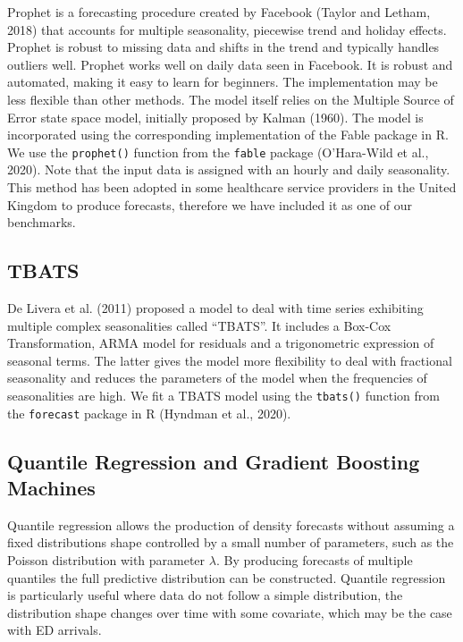 \documentclass[]{elsarticle} %
\begin{document}
Prophet is a forecasting procedure created by Facebook
(Taylor and Letham, 2018) that accounts for multiple seasonality,
piecewise trend and holiday effects. Prophet is robust to missing data
and shifts in the trend and typically handles outliers well. Prophet
works well on daily data seen in Facebook. It is robust and automated,
making it easy to learn for beginners. The implementation may be less
flexible than other methods. The model itself relies on the Multiple
Source of Error state space model, initially proposed by Kalman (1960).
The model is incorporated using the corresponding implementation of the
Fable package in R. We use the \texttt{prophet()} function from the \texttt{fable}
package (O'Hara-Wild et al., 2020). Note that the input data is assigned with an
hourly and daily seasonality. This method has been adopted in some healthcare service providers in the United Kingdom to produce forecasts, therefore we have included it as one of our
benchmarks.

\hypertarget{tbats}{%
\subsection{TBATS}\label{tbats}}

De Livera et al. (2011) proposed a model to deal with time series exhibiting
multiple complex seasonalities called ``TBATS''. It includes a Box-Cox
Transformation, ARMA model for residuals and a trigonometric expression
of seasonal terms. The latter gives the model more flexibility to deal
with fractional seasonality and reduces the parameters of the model when
the frequencies of seasonalities are high. We fit a TBATS model using
the \texttt{tbats()} function from the \texttt{forecast} package in R
(Hyndman et al., 2020).

\hypertarget{quantile-regression-and-gradient-boosting-machines}{%
\subsection{Quantile Regression and Gradient Boosting Machines}\label{quantile-regression-and-gradient-boosting-machines}}

Quantile regression allows the production of density forecasts without
assuming a fixed distributions shape controlled by a small number of
parameters, such as the Poisson distribution with parameter \(\lambda\).
By producing forecasts of multiple quantiles the full predictive
distribution can be constructed. Quantile regression is particularly
useful where data do not follow a simple distribution, the
distribution shape changes over time with some covariate, which may
be the case with ED arrivals.
\end{document}
